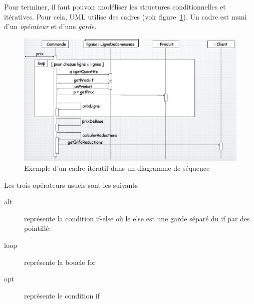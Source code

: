 Pour terminer,
il faut pouvoir modéliser les structures conditionnelles et itératives.
Pour cela,
UML utilise des cadres (voir figure~\ref{diagramme_sequences_cadres}).
Un cadre est muni d'un \emph{opérateur} et d'une \emph{garde}.
\begin{figure}[h]
  \centering
  \includegraphics[scale=0.60]{diagramme_sequences_cadres.jpg}
  \caption{Exemple d'un cadre itératif dans un diagramme de séquence}
  \label{diagramme_sequences_cadres}
\end{figure}
Les trois opérateurs usuels sont les suivants
\begin{description}
  \item[alt] représente la condition if-else où le else est
    une garde séparé du if par des pointillé.
  \item[loop] représente la boucle for
  \item[opt] représente le condition if
\end{description}


